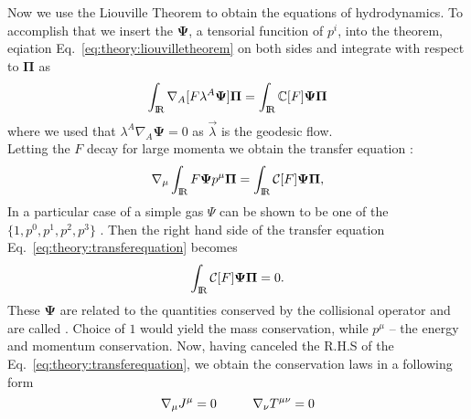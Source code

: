 Now we use the Liouville Theorem to obtain the equations of hydrodynamics. 
To accomplish that we insert the $\boldsymbol{\Psi}$, a tensorial funcition of 
$p^i$, into the theorem, eqiation Eq.~\eqref{eq:theory:liouvilletheorem} on both sides and 
integrate with respect to $\boldsymbol{\Pi}$ as
%
\begin{equation}
\int_{\text{I\!R}}\nabla_{A}[F\lambda^A\boldsymbol{\Psi}]\boldsymbol{\Pi}=\int_{\text{I\!R}}\mathbb{C}[F]\boldsymbol{\Psi}\boldsymbol{\Pi}
\end{equation}
%
where we used that $\lambda^A\nabla_{A}\boldsymbol{\Psi}=0$ as $\vec{\lambda}$ is the geodesic flow. \\
%
Letting the $F$ decay for large momenta we obtain the transfer equation \citep{Israel:1963,Cercignani:2002}:
%
\begin{equation}
\nabla_{\mu}\int_{\text{I\!R}} F\boldsymbol{\Psi}p^{\mu}\boldsymbol{\Pi} =\int_{\text{I\!R}} \mathcal{C}[F]\boldsymbol{\Psi}\boldsymbol{\Pi},
\label{eq:theory:transferequation}
\end{equation}
%
%
In a particular case of a simple gas $\Psi$ can be shown to be one of the 
$\{1,p^0,p^1,p^2,p^3\}$ \citep{Cercignani:2002}. 
Then the right hand side of the transfer equation Eq.~\eqref{eq:theory:transferequation} becomes 
%
\begin{equation}
\int_{\text{I\!R}} \mathcal{C}[F]\boldsymbol{\Psi}\boldsymbol{\Pi} = 0.
\end{equation}
%
These $\boldsymbol{\Psi}$ are related to the quantities conserved by the 
collisional operator and are called . 
Choice of $1$ would yield the mass conservation, while $p^{\mu}$ -- the energy and momentum conservation. 
%
Now, having canceled the R.H.S of the Eq.~\eqref{eq:theory:transferequation}, 
we obtain the conservation laws in a following form
%
\begin{equation}
\nabla_{\mu}J^{\mu} =0 \hspace{10mm}\nabla_{\nu}T^{\mu\nu} =0
\end{equation}